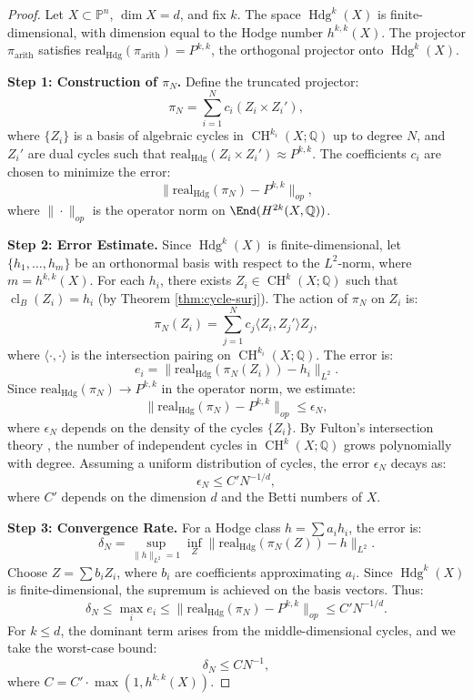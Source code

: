 \documentclass[11pt]{article}
\DeclareMathOperator{\cl}{cl}
\DeclareMathOperator{\CH}{CH}
\DeclareMathOperator{\Hdg}{Hdg}
\begin{document}
\begin{proof}
Let \( X \subset \mathbb{P}^n \), \(\dim X = d\), and fix \( k \). The space \(\Hdg^k(X)\) is finite-dimensional, with dimension equal to the Hodge number \( h^{k,k}(X) \). The projector \(\pi_{\mathrm{arith}}\) satisfies \(\mathrm{real}_{\mathrm{Hdg}}(\pi_{\mathrm{arith}}) = P^{k,k}\), the orthogonal projector onto \(\Hdg^k(X)\).

\textbf{Step 1: Construction of \(\pi_N\).}
Define the truncated projector:
\[
\pi_N = \sum_{i=1}^N c_i (Z_i \times Z_i'),
\]
where \( \{ Z_i \} \) is a basis of algebraic cycles in \(\CH^{k_i}(X; \mathbb{Q})\) up to degree \( N \), and \( Z_i' \) are dual cycles such that \(\mathrm{real}_{\mathrm{Hdg}}(Z_i \times Z_i') \approx P^{k,k}\). The coefficients \( c_i \) are chosen to minimize the error:
\[
\|\mathrm{real}_{\mathrm{Hdg}}(\pi_N) - P^{k,k}\|_{op},
\]
where \(\|\cdot\|_{op}\) is the operator norm on \(\End(H^{2k}(X, \mathbb{Q}))\).

\textbf{Step 2: Error Estimate.}
Since \(\Hdg^k(X)\) is finite-dimensional, let \( \{ h_1, \ldots, h_m \} \) be an orthonormal basis with respect to the \( L^2 \)-norm, where \( m = h^{k,k}(X) \). For each \( h_i \), there exists \( Z_i \in \CH^k(X; \mathbb{Q}) \) such that \(\cl_B(Z_i) = h_i \) (by Theorem \ref{thm:cycle-surj}). The action of \(\pi_N\) on \( Z_i \) is:
\[
\pi_N(Z_i) = \sum_{j=1}^N c_j \langle Z_i, Z_j' \rangle Z_j,
\]
where \(\langle \cdot, \cdot \rangle\) is the intersection pairing on \(\CH^{k_i}(X; \mathbb{Q})\). The error is:
\[
e_i = \|\mathrm{real}_{\mathrm{Hdg}}(\pi_N(Z_i)) - h_i\|_{L^2}.
\]
Since \(\mathrm{real}_{\mathrm{Hdg}}(\pi_N) \to P^{k,k}\) in the operator norm, we estimate:
\[
\|\mathrm{real}_{\mathrm{Hdg}}(\pi_N) - P^{k,k}\|_{op} \leq \epsilon_N,
\]
where \(\epsilon_N\) depends on the density of the cycles \( \{ Z_i \} \). By Fulton’s intersection theory \cite{fulton1984}, the number of independent cycles in \(\CH^k(X; \mathbb{Q})\) grows polynomially with degree. Assuming a uniform distribution of cycles, the error \(\epsilon_N\) decays as:
\[
\epsilon_N \leq C' N^{-1/d},
\]
where \( C' \) depends on the dimension \( d \) and the Betti numbers of \( X \).

\textbf{Step 3: Convergence Rate.}
For a Hodge class \( h = \sum a_i h_i \), the error is:
\[
\delta_N = \sup_{\|h\|_{L^2}=1} \inf_Z \|\mathrm{real}_{\mathrm{Hdg}}(\pi_N(Z)) - h\|_{L^2}.
\]
Choose \( Z = \sum b_i Z_i \), where \( b_i \) are coefficients approximating \( a_i \). Since \(\Hdg^k(X)\) is finite-dimensional, the supremum is achieved on the basis vectors. Thus:
\[
\delta_N \leq \max_i e_i \leq \|\mathrm{real}_{\mathrm{Hdg}}(\pi_N) - P^{k,k}\|_{op} \leq C' N^{-1/d}.
\]
For \( k \leq d \), the dominant term arises from the middle-dimensional cycles, and we take the worst-case bound:
\[
\delta_N \leq C N^{-1},
\]
where \( C = C' \cdot \max(1, h^{k,k}(X)) \).


\end{proof}
\end{document}

